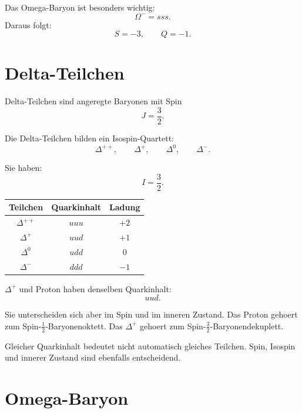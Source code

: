 \begin{examtipbox}
Das Omega-Baryon ist besonders wichtig:
\[
    \Omega^- = sss.
\]
Daraus folgt:
\[
    S=-3,
    \qquad
    Q=-1.
\]
\end{examtipbox}

\section{Delta-Teilchen}

Delta-Teilchen sind angeregte Baryonen mit Spin
\[
    J=\frac{3}{2}.
\]

\begin{conceptbox}
Die Delta-Teilchen bilden ein Isospin-Quartett:
\[
    \Delta^{++},
    \qquad
    \Delta^+,
    \qquad
    \Delta^0,
    \qquad
    \Delta^-.
\]

Sie haben:
\[
    I=\frac{3}{2}.
\]
\end{conceptbox}

\begin{center}
\begin{tabular}{|c|c|c|}
\hline
Teilchen & Quarkinhalt & Ladung \\
\hline
$\Delta^{++}$ & $uuu$ & $+2$ \\
\hline
$\Delta^+$ & $uud$ & $+1$ \\
\hline
$\Delta^0$ & $udd$ & $0$ \\
\hline
$\Delta^-$ & $ddd$ & $-1$ \\
\hline
\end{tabular}
\end{center}

\begin{conceptbox}
$\Delta^+$ und Proton haben denselben Quarkinhalt:
\[
    uud.
\]

Sie unterscheiden sich aber im Spin und im inneren Zustand.
Das Proton gehoert zum Spin-$\frac{1}{2}$-Baryonenoktett.
Das $\Delta^+$ gehoert zum Spin-$\frac{3}{2}$-Baryonendekuplett.
\end{conceptbox}

\begin{examtipbox}
Gleicher Quarkinhalt bedeutet nicht automatisch gleiches Teilchen.
Spin, Isospin und innerer Zustand sind ebenfalls entscheidend.
\end{examtipbox}

\section{Omega-Baryon}

